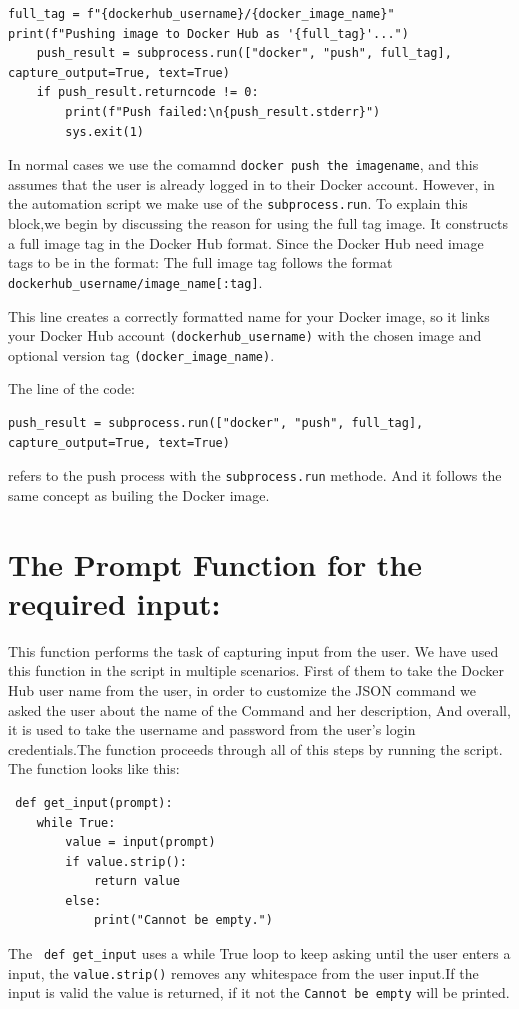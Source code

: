 \begin{lstlisting}
full_tag = f"{dockerhub_username}/{docker_image_name}"
print(f"Pushing image to Docker Hub as '{full_tag}'...")
    push_result = subprocess.run(["docker", "push", full_tag], capture_output=True, text=True)
    if push_result.returncode != 0:
        print(f"Push failed:\n{push_result.stderr}")
        sys.exit(1)

\end{lstlisting}

In normal cases we use the comamnd \texttt{docker push the imagename}, and this assumes that the user is already logged in to their Docker account. However, in the automation script we make use of the \texttt{subprocess.run}. 
To explain this block,we begin by discussing the reason for using the full tag image. It constructs a full image tag in the Docker Hub format. Since the Docker Hub need image tags  to be in the format: The full image tag follows the format \texttt{dockerhub\_username/image\_name[:tag]}.

This line creates a correctly formatted name for your Docker image, so it links your Docker Hub account \texttt{(dockerhub\_username)} with the chosen image and optional version tag \texttt{(docker\_image\_name)}.

The line of the code: 
\begin{lstlisting}
push_result = subprocess.run(["docker", "push", full_tag], capture_output=True, text=True)
\end{lstlisting}
refers to the push process with the \texttt{subprocess.run} methode. And it follows the same concept as builing the Docker image. 

\section{The Prompt Function for the required input:}

 This function performs the task of capturing input from the user.
 We have used this function in the script in multiple scenarios. First of them to take the Docker Hub user name from the user, in order to customize the JSON command we asked the user about the name of the Command and her description, And overall, it is used to take the username and password from the user's login credentials.The function proceeds through all of this steps by running the script.
 The function looks like this:
 
 \begin{lstlisting}
 def get_input(prompt):
    while True:
        value = input(prompt)
        if value.strip():
            return value
        else:
            print("Cannot be empty.")

\end{lstlisting}
The \texttt{ def get\_input} uses a while True loop to keep asking until the user enters a input, the \texttt{value.strip()} removes any whitespace from the user input.If the input is valid the value is returned, if it not the \texttt{Cannot be empty} will be printed.


